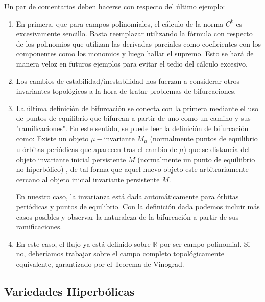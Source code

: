 \begin{rmrk}
	Un par de comentarios deben hacerse con respecto del último ejemplo:
	
	\begin{enumerate}
		\item En primera, que para campos polinomiales, el cálculo de la norma $C^k$ es excesivamente sencillo. Basta reemplazar utilizando la fórmula con respecto de los polinomios que utilizan las derivadas parciales como coeficientes con los componentes como los monomios y luego hallar el supremo. Esto se hará de manera veloz en futuros ejemplos para evitar el tedio del cálculo excesivo.
		
		\item Los cambios de estabilidad/inestabilidad nos fuerzan a considerar otros invariantes topológicos a la hora de tratar problemas de bifurcaciones.
		
		\item La última definición de bifurcación se conecta con la primera mediante el uso de puntos de equilibrio que bifurcan a partir de uno como un camino y sus "ramificaciones". En este sentido, se puede leer la definición de bifurcación como: Existe un objeto $\mu-$invariante $M_\mu$ (normalmente puntos de equilibrio u órbitas periódicas que aparecen tras el cambio de $\mu$) que se distancia del objeto invariante inicial persistente $M$ (normalmente un punto de equiliibrio no hiperbólico) , de tal forma que aquel nuevo objeto este arbitrariamente cercano al objeto inicial invariante persistente $M$.
		
		En nuestro caso, la invarianza está dada automáticamente para órbitas periódicas y puntos de equilibrio. Con la definición dada podemos incluir más casos posibles y observar la naturaleza de la bifurcación a partir de sus ramificaciones.
		
		\item En este caso, el flujo ya está definido sobre $\mathbb{R}$ por ser campo polinomial. Si no, deberíamos trabajar sobre el campo completo topológicamente equivalente, garantizado por el Teorema de Vinograd.
	\end{enumerate}
\end{rmrk}



\subsection{Variedades Hiperbólicas}

